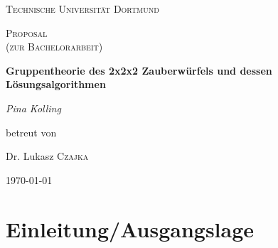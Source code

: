 \documentclass[12pt,a4paper, usenames, dvipsnames]{scrartcl}
\begin{document}
\begin{titlepage}
	\centering
	\vspace*{4cm}
	{\scshape\LARGE Technische Universität Dortmund \par}
	\vspace{1cm}
	{\scshape\Large Proposal \\
	(zur Bachelorarbeit) \par}
	\vspace{1.5cm}
	{\huge\bfseries  Gruppentheorie des 2x2x2 Zauberwürfels und dessen Lösungsalgorithmen \par}
	\vspace{2cm}
	{\Large\itshape Pina Kolling\par}
	\vfill
	betreut von\par
	Dr. Lukasz \textsc{Czajka}

	\vfill

	{\large \today\par}
\end{titlepage}


\tableofcontents

\thispagestyle{empty} 



\newpage

\setcounter{page}{1} 



















\section{Einleitung/Ausgangslage}
\end{document}
